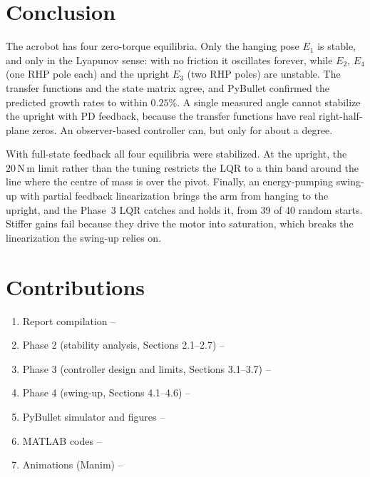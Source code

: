 \documentclass[12pt,a4paper]{article}
\newcommand{\Nm}{\,\mathrm{N\,m}}
\begin{document}
\section{Conclusion}
The acrobot has four zero-torque equilibria. Only the hanging pose $E_1$ is stable, and only in the Lyapunov sense: with no friction it oscillates forever, while $E_2$, $E_4$ (one RHP pole each) and the upright $E_3$ (two RHP poles) are unstable. The transfer functions and the state matrix agree, and PyBullet confirmed the predicted growth rates to within $0.25\%$. A single measured angle cannot stabilize the upright with PD feedback, because the transfer functions have real right-half-plane zeros. An observer-based controller can, but only for about a degree.

With full-state feedback all four equilibria were stabilized. At the upright, the $20\Nm$ limit rather than the tuning restricts the LQR to a thin band around the line where the centre of mass is over the pivot. Finally, an energy-pumping swing-up with partial feedback linearization brings the arm from hanging to the upright, and the Phase~3 LQR catches and holds it, from 39 of 40 random starts. Stiffer gains fail because they drive the motor into saturation, which breaks the linearization the swing-up relies on.

\section{Contributions}
\begin{enumerate}
\item Report compilation -- \underline{\hspace{4cm}}
\item Phase 2 (stability analysis, Sections 2.1--2.7) -- \underline{\hspace{4cm}}
\item Phase 3 (controller design and limits, Sections 3.1--3.7) -- \underline{\hspace{4cm}}
\item Phase 4 (swing-up, Sections 4.1--4.6) -- \underline{\hspace{4cm}}
\item PyBullet simulator and figures -- \underline{\hspace{4cm}}
\item MATLAB codes -- \underline{\hspace{4cm}}
\item Animations (Manim) -- \underline{\hspace{4cm}}
\end{enumerate}
\end{document}
